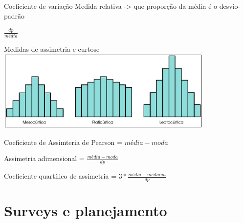 \documentclass[
  9pt,
  ignorenonframetext,
  aspectratio=169]{beamer}
\begin{document}
\begin{frame}{Coeficiente de variação}
\protect\hypertarget{coeficiente-de-variauxe7uxe3o}{}
Medida relativa -\textgreater{} que proporção da média é o desvio-padrão

\(\frac{dp}{média}\)
\end{frame}

\begin{frame}{Medidas de assimetria e curtose}
\protect\hypertarget{medidas-de-assimetria-e-curtose}{}
\includegraphics{imgs/curtose.png}

Coeficiente de Assimteria de Pearson = \(média - moda\)

Assimetria adimensional = \(\frac{média - moda}{dp}\)

Coeficiente quartílico de assimetria = \(3*\frac{média-mediana}{dp}\)
\end{frame}

\hypertarget{surveys-e-planejamento}{%
\section{Surveys e planejamento}\label{surveys-e-planejamento}}
\end{document}
